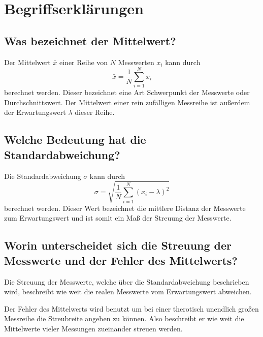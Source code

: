 \section{Begriffserklärungen}
\label{sec:Begriffe}

\subsection{Was bezeichnet der Mittelwert?}
\label{ssec:Mittelwert}

Der Mittelwert $\bar{x}$ einer Reihe von $N$ Messwerten $x_i$ kann durch
\begin{equation}
    \bar{x} = \frac{1}{N} \sum_{i=1}^N x_i 
\end{equation}
berechnet werden. 
Dieser bezeichnet eine Art Schwerpunkt der Messwerte oder Durchschnittswert. 
Der Mittelwert einer rein zufälligen Messreihe ist außerdem der Erwartungswert $\lambda$ dieser Reihe.

\subsection{Welche Bedeutung hat die Standardabweichung?}
\label{ssec:Standardabweichung}

Die Standardabweichung $\sigma$ kann durch
\begin{equation}
    \sigma = \sqrt{\frac{1}{N} \sum_{i=1}^N (x_i - \lambda)^2}
\end{equation}
berechnet werden. 
Dieser Wert bezeichnet die mittlere Distanz der Messwerte zum Erwartungswert und ist somit ein Maß der Streuung der Messwerte.

\subsection{Worin unterscheidet sich die Streuung der Messwerte und der Fehler des Mittelwerts?}
\label{ssec:Streuung-Fehler}

Die Streuung der Messwerte, welche über die Standardabweichung beschrieben wird, beschreibt wie weit die realen Messwerte vom Erwartungswert abweichen.

Der Fehler des Mittelwerts wird benutzt um bei einer therotisch unendlich großen Messreihe die Streubreite angeben zu können.
Also beschreibt er wie weit die Mittelwerte vieler Messungen zueinander streuen werden.